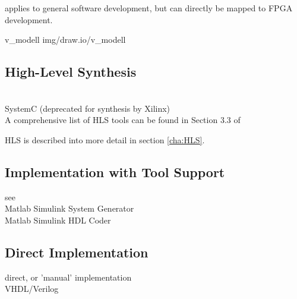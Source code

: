 applies to general software development, but can directly be mapped to FPGA development.

 {v_modell} {img/draw.io/v_modell}

\subsection{High-Level Synthesis}
\cplusplus\\
SystemC (deprecated for synthesis by Xilinx)\\

A comprehensive list of HLS tools can be found in Section 3.3 of \cite{2016FfSP}

HLS is described into more detail in section \ref{cha:HLS}.

\subsection{Implementation with Tool Support}
see \cite{GesslerRalf2014EES}\\

Matlab Simulink System Generator\\
Matlab Simulink HDL Coder\\

\subsection{Direct Implementation}

direct, or 'manual' implementation\\
VHDL/Verilog\\
